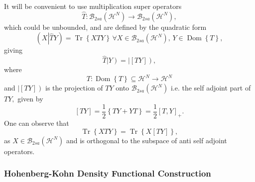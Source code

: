 \documentclass[aps,preprint]{revtex4}%
\begin{document}
It will be convenient to use multiplication super operators
\begin{equation}
\widehat{T}:\mathcal{B}_{2sa}\left(  \mathcal{H}^{N}\right)  \rightarrow
\mathcal{B}_{2sa}\left(  \mathcal{H}^{N}\right)  ,
\end{equation}
which could be unbounded, and are defined by the quadratic form
\cite{weiner05}
\begin{equation}
\left(  X\left\vert \widehat{T}Y\right.  \right)  =\operatorname{Tr}\left\{
XTY\right\}  \,\forall X\in\mathcal{B}_{2sa}\left(  \mathcal{H}^{N}\right)
,\,Y\in\operatorname{Dom}\left\{  T\right\}  ,
\end{equation}
giving
\begin{equation}
\widehat{T}\left\vert Y\right)  =\left\vert \left[  TY\right]  \right)  ,
\end{equation}
where
\begin{equation}
T:\operatorname{Dom}\left\{  T\right\}  \subseteq\mathcal{H}^{N}%
\rightarrow\mathcal{H}^{N}%
\end{equation}
and $\left\vert \left[  TY\right]  \right)  $ is the projection of $TY$ onto
$\mathcal{B}_{2sa}\left(  \mathcal{H}^{N}\right)  $ i.e. the self adjoint part
of $TY,$ given by
\[
\left[  TY\right]  =\frac{1}{2}\left\{  TY+YT\right\}  =\frac{1}{2}\left[
T,Y\right]  _{+}.
\]
One can observe that
\begin{equation}
\operatorname{Tr}\left\{  XTY\right\}  =\operatorname{Tr}\left\{  X\left[
TY\right]  \right\}  ,
\end{equation}
as $X\in\mathcal{B}_{2sa}\left(  \mathcal{H}^{N}\right)  $ and is orthogonal
to the subspace of anti self adjoint operators.

\subsubsection{Hohenberg-Kohn Density Functional Construction}
\end{document}
